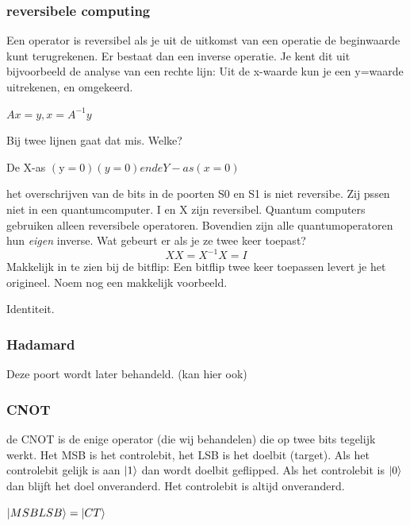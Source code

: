 \documentclass[../../main.tex]{subfiles}
\begin{document}
\subsubsection*{reversibele computing}
Een operator is reversibel als je uit de uitkomst van een operatie de beginwaarde kunt terugrekenen. Er bestaat dan een inverse operatie. Je kent dit uit bijvoorbeeld de analyse van een rechte lijn: Uit de x-waarde kun je een y=waarde uitrekenen, en omgekeerd. 

$Ax=y, x=A^{-1}y$

\fun Bij twee lijnen gaat dat mis. Welke?

De X-as $\mathrm{(y=0)}(y=0) en de Y-as (x=0)$


het overschrijven van de bits in de poorten S0 en S1 is niet reversibe. Zij pssen niet in een quantumcomputer. I en X zijn reversibel. Quantum computers gebruiken alleen reversibele operatoren. Bovendien zijn alle quantumoperatoren  hun \textit{eigen} inverse. Wat gebeurt er als je ze twee keer toepast?
$$XX=X^{-1}X=I$$
Makkelijk in te zien bij de bitflip: Een bitflip twee keer toepassen levert je het origineel.
\easy Noem nog een makkelijk voorbeeld.

Identiteit.


\subsubsection{Hadamard}
Deze poort wordt later behandeld. (kan hier ook)
\subsubsection{CNOT}
de CNOT is de enige operator (die wij behandelen) die op twee bits tegelijk werkt. Het MSB is het controlebit, het LSB is het doelbit (target). Als het controlebit gelijk is aan $\ket{1}$  dan wordt doelbit geflipped. Als het controlebit is $\ket{0}$ dan blijft het doel onveranderd. Het controlebit is altijd onveranderd.

$\ket{MSB LSB}=\ket{CT}$

\end{document}
